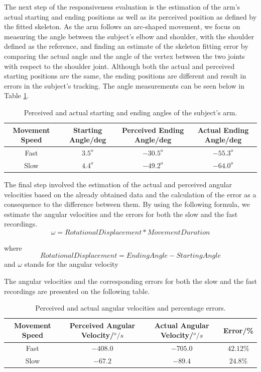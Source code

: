 \documentclass[10pt]{article}
\begin{document}
The next step of the responsiveness evaluation is the estimation of the arm's actual starting and ending positions as well as its perceived position as defined by the fitted skeleton. As the arm follows an arc-shaped movement, we focus on measuring the angle between the subject's elbow and shoulder, with the shoulder  defined as the reference, and finding an estimate of the skeleton fitting error by comparing the actual angle and the angle of the vertex between the two joints with respect to the shoulder joint. Although both the actual and perceived starting positions are the same, the ending positions are different and result in errors in the subject's tracking. The angle measurements can be seen below in Table \ref{angle}.

\begin{table}[H]
\center
\begin{tabular}{| c | c | c | c |}
\hline
Movement Speed & Starting Angle/deg & Perceived Ending Angle/deg & Actual Ending Angle/deg\\
\hline
Fast & $3.5^o$ & $-30.5^o$ & $-55.3^o$\\
Slow & $4.4^o$ & $-49.2^o$ & $-64.0^o$\\
\hline
\end{tabular}
\caption{Perceived and actual starting and ending angles of the subject's arm.}
\label{angle}
\end{table}

The final step involved the estimation of the actual and perceived angular velocities based on the already obtained data and the calculation of the error as a consequence to the difference between them. By using the following formula, we estimate the angular velocities and the errors for both the slow and the fast recordings.
\begin{equation}
\omega = RotationalDisplacement * MovementDuration
\end{equation}

\noindent where \[RotationalDisplacement = EndingAngle - StartingAngle\]
and  $\omega$ stands for the angular velocity

\noindent The angular velocities and the corresponding errors for both the slow and the fast recordings are presented on the following table.

\begin{table}[H]
\center
\begin{tabular}{| c | c | c | c |}
\hline
Movement Speed & Perceived Angular Velocity/$^o/s$ & Actual Angular Velocity/$^o/s$ & Error/\% \\
\hline
Fast & $-408.0$ & $-705.0$ & $42.12\%$ \\
Slow & $-67.2$ & $-89.4$ & $24.8\%$ \\
\hline
\end{tabular}
\caption{Perceived and actual angular velocities and percentage errors.}
\end{table}
\end{document}
